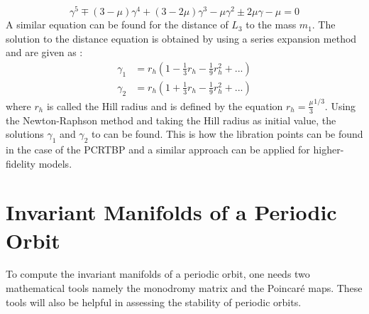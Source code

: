 \begin{equation}
\label{gammadist}
\gamma^5 \mp (3 - \mu)\gamma^4 + (3-2\mu)\gamma^3 - \mu \gamma^2 \pm 2 \mu \gamma - \mu = 0
\end{equation}
%
A similar equation can be found for the distance of $L_3$ to the mass $m_1$. The solution to the distance equation is obtained by using a series expansion method and are given as \cite{invariant}:
\begin{equation}
\begin{aligned}
\gamma_1 &= r_h (1- \frac{1}{3}r_h - \frac{1}{9}r_h^2+...) \\
\gamma_2 &= r_h (1 + \frac{1}{3}r_h - \frac{1}{9}r_h^2+...)
\end{aligned}
\end{equation}
%
where $r_h$ is called the Hill radius and is defined by the equation $r_h = \frac{\mu}{3}^{1/3}$. Using the Newton-Raphson method and taking the Hill radius as initial value, the solutions $\gamma_1$ and $\gamma_2$ to  can be found. This is how the libration points can be found in the case of the \gls{PCRTBP} and a similar approach can be applied for higher-fidelity models.

\section{Invariant Manifolds of a Periodic Orbit}
To compute the invariant manifolds of a periodic orbit, one needs two mathematical tools namely the monodromy matrix and the Poincar\'e maps. These tools will also be helpful in assessing the stability of periodic orbits.

